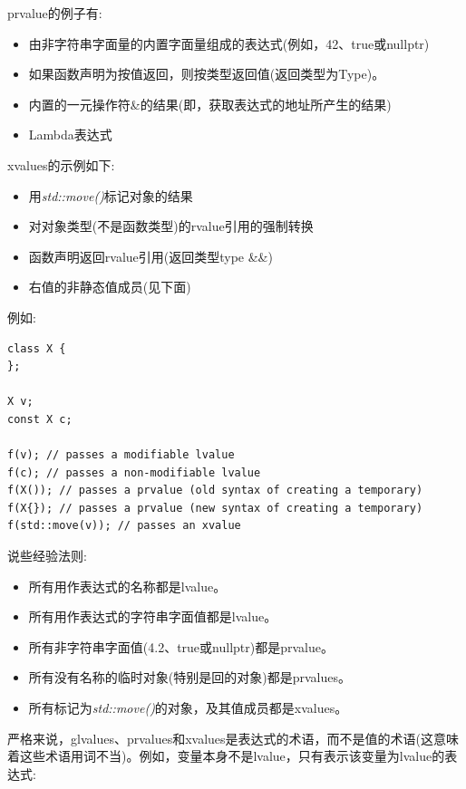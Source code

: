 prvalue的例子有:\par

\begin{itemize}
	\item 由非字符串字面量的内置字面量组成的表达式(例如，42、true或nullptr)
	\item 如果函数声明为按值返回，则按类型返回值(返回类型为Type)。
	\item 内置的一元操作符\&的结果(即，获取表达式的地址所产生的结果)
	\item Lambda表达式
\end{itemize}

xvalues的示例如下:\par

\begin{itemize}
	\item 用\textit{std::move()}标记对象的结果
	\item 对对象类型(不是函数类型)的rvalue引用的强制转换
	\item 函数声明返回rvalue引用(返回类型type \&\&)
	\item 右值的非静态值成员(见下面)
\end{itemize}

例如:\par

\begin{lstlisting}[caption={}]
class X {
};

X v;
const X c;

f(v); // passes a modifiable lvalue
f(c); // passes a non-modifiable lvalue
f(X()); // passes a prvalue (old syntax of creating a temporary)
f(X{}); // passes a prvalue (new syntax of creating a temporary)
f(std::move(v)); // passes an xvalue
\end{lstlisting}

说些经验法则:\par

\begin{itemize}
	\item 所有用作表达式的名称都是lvalue。
	\item 所有用作表达式的字符串字面值都是lvalue。
	\item 所有非字符串字面值(4.2、true或nullptr)都是prvalue。
	\item 所有没有名称的临时对象(特别是回的对象)都是prvalues。
	\item 所有标记为\textit{std::move()}的对象，及其值成员都是xvalues。
\end{itemize}

严格来说，glvalues、prvalues和xvalues是表达式的术语，而不是值的术语(这意味着这些术语用词不当)。例如，变量本身不是lvalue，只有表示该变量为lvalue的表达式:\par


